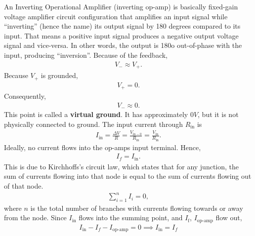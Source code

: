\documentclass{report}
\begin{document}
\begin{itemize}
            \bigbreak \noindent 
            An Inverting Operational Amplifier (inverting op-amp) is basically fixed-gain voltage amplifier circuit configuration that amplifies an input signal while “inverting” (hence the name) its output signal by 180 degrees compared to its input.
            \bigbreak \noindent 
            That means a positive input signal produces a negative output voltage signal and vice-versa. In other words, the output is 180o out-of-phase with the input, producing “inversion”.
            \bigbreak \noindent 
            \bigbreak \noindent 
            Because of the feedback,
            \begin{align*}
                V_{-} \approx V_{+}
            .\end{align*}
            Because $V_{+}$ is grounded,
            \begin{align*}
                V_{+} = 0
            .\end{align*}
            Consequently,
            \begin{align*}
                V_{-} \approx 0
            .\end{align*}
            This point is called a \textbf{virtual ground}. It has approximately $0V$, but it is not physically connected to ground. 
            \bigbreak \noindent 
            The input current through $R_{\text{in}}$ is 
            \begin{align*}
                I_{\text{in}} = \frac{\Delta V}{R} = \frac{V_{\text{in} - 0}}{R_{\text{in}}} = \frac{V_{\text{in}}}{R_{\text{in}}}
            .\end{align*}
            Ideally, no current flows into the op-amps input terminal. Hence,
            \begin{align*}
                I_{f} = I_{\text{in}}
            .\end{align*}
            This is due to Kirchhoffs's circuit law, which states that for any junction, the sum of currents flowing into that node is equal to the sum of currents flowing out of that node.
            \begin{align*}
                \sum_{i=1}^{n}I_{i} = 0
            ,\end{align*}
            where $n$ is the total number of branches with currents flowing towards or away from the node. Since $I_{\text{in}}$ flows into the summing point, and $I_{\text{f}}$, $I_{\text{op-amp}} $ flow out,
            \begin{align*}
                I_{\text{in}} - I_{f} - I_{\text{op-amp}} = 0 \implies I_{\text{in}} = I_{f}

\end{align*}
\end{itemize}
\end{document}
